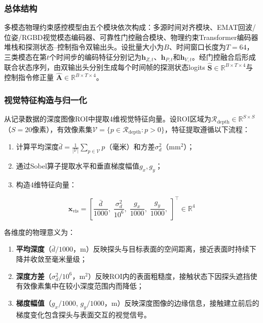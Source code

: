 \subsubsection{总体结构}

多模态物理约束感控模型由五个模块依次构成：多源时间对齐模块、EMAT回波/位姿/RGBD视觉模态编码器、可靠性门控融合模块、物理约束Transformer编码器堆栈和探测状态--控制指令双输出头。设批量大小为$B$、时间窗口长度为$T=64$，三类模态在第$t$个时间步的编码特征分别记为$\mathbf{h}_{Z,t}$、$\mathbf{h}_{P,t}$和$\mathbf{h}_{V,t}$。经门控融合后形成联合状态序列，由双输出头分别生成每个时间帧的探测状态logits $\hat{\mathbf{S}} \in \mathbb{R}^{B \times T \times 4}$与控制指令修正量 $\hat{\mathbf{A}} \in \mathbb{R}^{B \times T \times 4}$。

\subsubsection{视觉特征构造与归一化}

从记录数据的深度图像ROI中提取4维视觉特征向量。设ROI区域为$\mathcal{R}_{\text{depth}} \in \mathbb{R}^{S \times S}$（$S = 20$像素），有效像素集$\mathcal{V} = \{p \in \mathcal{R}_{\text{depth}} : p > 0\}$，特征提取遵循以下流程：

\begin{enumerate}[label=(\arabic*)]
\item 计算平均深度$\bar{d} = \frac{1}{|\mathcal{V}|} \sum_{p \in \mathcal{V}} p$（毫米）和方差$\sigma_d^2$（$\text{mm}^2$）；
\item 通过Sobel算子提取水平和垂直梯度幅值$g_x, g_y$；
\item 构造4维特征向量：
\end{enumerate}

\begin{equation}
\mathbf{x}_{\text{vis}} = \left[
\frac{\bar{d}}{1000}, \;
\frac{\sigma_d^2}{10^6}, \;
\frac{g_x}{1000}, \;
\frac{g_y}{1000}, \;
\right]^\top \in \mathbb{R}^4
\label{eq:vis_feature}
\end{equation}

各维度的物理意义为：

\begin{enumerate}[label=(\arabic*)]
\item \textbf{平均深度}（$\bar{d}/1000$，m）反映探头与目标表面的空间距离，接近表面时持续下降并收敛至毫米量级；
\item \textbf{深度方差}（$\sigma_d^2/10^6$，$\text{m}^2$）反映ROI内的表面粗糙度，接触状态下因探头遮挡使有效像素集中在较小深度范围内而降低；
\item \textbf{梯度幅值}（$g_x/1000$, $g_y/1000$，m）反映深度图像的边缘信息，接触建立前后的梯度变化包含探头与表面交互的视觉信号。
\end{enumerate}

